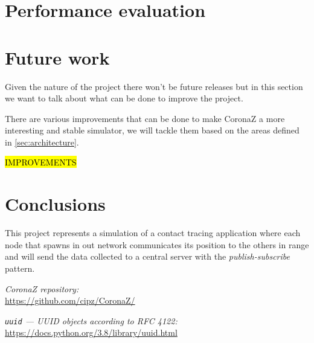 \documentclass[conference]{IEEEtran}
\begin{document}
\section{Performance evaluation}

	

\section{Future work}\label{sec:future_work}

	Given the nature of the project there won't be future releases but in this section we want to talk about what can be done to improve the project.
	
	There are various improvements that can be done to make CoronaZ a more interesting and stable simulator, we will tackle them based on the areas defined in \ref{sec:architecture}.
	
	\hl{IMPROVEMENTS}
	
\section{Conclusions}\label{sec:conclusions}

	This project represents a simulation of a contact tracing application where each node that spawns in out network communicates its position to the others in range and will send the data collected to a central server with the \textit{publish-subscribe} pattern.

\begin{thebibliography}{00}
	
		\textit{CoronaZ repository:}\\
		\url{https://github.com/cipz/CoronaZ/}
	
		\textit{\texttt{uuid} — UUID objects according to RFC 4122:}\\
		\url{https://docs.python.org/3.8/library/uuid.html}
		
\end{thebibliography}
\end{document}
